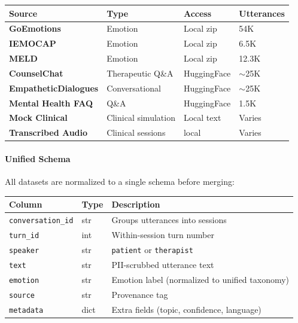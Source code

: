 \documentclass[11pt,a4paper]{article}
\begin{document}
\begin{center}
\begin{tcolorbox}[colback=white, colframe=teal, enhanced, breakable, title=Data Source Inventory, fonttitle=\sffamily\bfseries]
\begin{tabular}{>{\sffamily\bfseries}p{2.2cm}p{2.4cm}p{3cm}p{3.5cm}}
\toprule
\textbf{Source} & \textbf{Type} & \textbf{Access} & \textbf{Utterances} \\
\midrule
GoEmotions & Emotion & Local zip & 54K \\
IEMOCAP & Emotion & Local zip & 6.5K \\
MELD & Emotion & Local zip & 12.3K \\
CounselChat & Therapeutic Q\&A & HuggingFace & $\sim$25K \\
EmpatheticDialogues & Conversational & HuggingFace & $\sim$25K \\
Mental Health FAQ & Q\&A & HuggingFace & 1.5K \\
Mock Clinical & Clinical simulation & Local text & Varies \\
Transcribed Audio & Clinical sessions & local & Varies \\
\bottomrule
\end{tabular}
\end{tcolorbox}
\end{center}

\paragraph{Unified Schema}

All datasets are normalized to a single schema before merging:

\begin{center}
\begin{tcolorbox}[colback=white, colframe=indigo, enhanced, breakable, title=Unified DataFrame Schema, fonttitle=\sffamily\bfseries]
\begin{tabular}{>{\ttfamily}p{3cm}p{2cm}p{7cm}}
\toprule
\textbf{Column} & \textbf{Type} & \textbf{Description} \\
\midrule
\texttt{conversation\_id} & str & Groups utterances into sessions \\
\texttt{turn\_id} & int & Within-session turn number \\
\texttt{speaker} & str & \texttt{patient} or \texttt{therapist} \\
\texttt{text} & str & PII-scrubbed utterance text \\
\texttt{emotion} & str & Emotion label (normalized to unified taxonomy) \\
\texttt{source} & str & Provenance tag \\
\texttt{metadata} & dict & Extra fields (topic, confidence, language) \\
\bottomrule
\end{tabular}
\end{tcolorbox}
\end{center}
\end{document}

